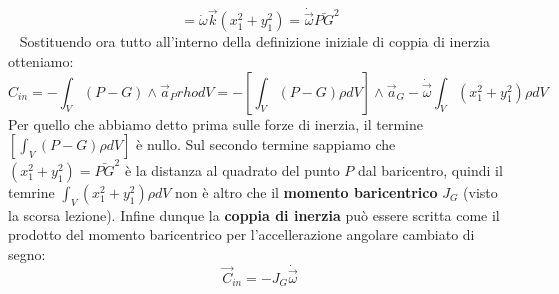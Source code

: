 \[
    = \dot{\omega} \vec{k} (x_1^2 + y_1^2) = \dot{\vec{\omega}} \bar{PG}^2
\]
\ \newline
Sostituendo ora tutto all'interno della definizione iniziale di coppia di inerzia otteniamo:
\[
    C_{in} = - \int_V (P-G) \land \vec{a}_P rho dV = - \left[\int_V (P-G) \rho dV\right] \land \vec{a}_G - \dot{\vec{\omega}} \int_V (x_1^2 + y_1^2) \rho dV 
\]
Per quello che abbiamo detto prima sulle forze di inerzia, il termine $\left[\int_V (P-G) \rho dV\right]$ è nullo.\newline
Sul secondo termine sappiamo che $(x_1^2 + y_1^2) = \bar{PG}^2$ è la distanza al quadrato del punto $P$ dal baricentro, quindi il temrine $\int_V (x_1^2 + y_1^2) \rho dV $ non è altro che il \textbf{momento baricentrico} $J_G$ (visto la scorsa lezione).\newline
\newline
Infine dunque la \textbf{coppia di inerzia} può essere scritta come il prodotto del momento baricentrico per l'accellerazione angolare cambiato di segno:
\[
    \vec{C}_{in} = - J_G \dot{\vec{\omega}}
\]